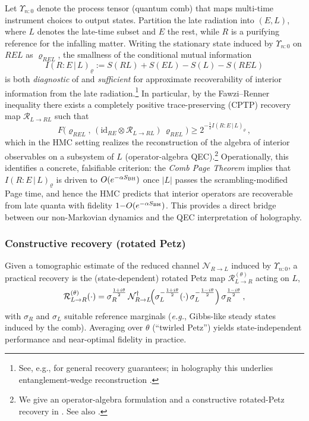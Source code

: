 \documentclass[aps,prd,preprint,onecolumn,superscriptaddress,nofootinbib,longbibliography,floatfix,11pt,showpacs,showkeys]{revtex4-2}
\newcommand{\eg}{\textit{e.g.}\xspace}
\newcommand{\HMC}{\textsc{HMC}\xspace}
\theoremstyle{plain}
\theoremstyle{definition}
\theoremstyle{remark}
\begin{document}
Let $\Upsilon_{n{:}0}$ denote the process tensor (quantum comb) that maps multi-time instrument choices to output states. Partition the late radiation into $(E,L)$, where $L$ denotes the late-time subset and $E$ the rest, while $R$ is a purifying reference for the infalling matter.
Writing the stationary state induced by $\Upsilon_{n{:}0}$ on $REL$ as $\varrho_{REL}$, the smallness of the conditional mutual information
\begin{equation}
I(R{:}E\,|\,L)_{\varrho} := S(RL) + S(EL) - S(L) - S(REL)
\end{equation}
is both \emph{diagnostic} of and \emph{sufficient} for approximate recoverability of interior information from the late radiation.\footnote{See, e.g., \cite{FawziRenner:2015} for general recovery guarantees; in holography this underlies entanglement-wedge reconstruction \cite{ADH:2015}.}
In particular, by the Fawzi--Renner inequality there exists a completely positive trace-preserving (CPTP) recovery map $\mathcal{R}_{L\to RL}$ such that
\begin{equation}
F\bigl(\varrho_{REL},\, (\mathrm{id}_{RE}\otimes \mathcal{R}_{L\to RL})\,\varrho_{REL}\bigr) \geq 2^{-\tfrac12 I(R{:}E\,|\,L)_{\varrho}}\,,
\end{equation}
which in the \HMC{} setting realizes the reconstruction of the algebra of interior observables on a subsystem of $L$ (operator-algebra QEC).\footnote{We give an operator-algebra formulation and a constructive rotated-Petz recovery in . See also \cite{Petz:1986,ADH:2015,Pastawski:2015}.}
Operationally, this identifies a concrete, falsifiable criterion: the \emph{Comb Page Theorem} implies that $I(R{:}E\,|\,L)_{\varrho}$ is driven to $O(e^{-\alpha S_{\rm BH}})$ once $|L|$ passes the scrambling-modified Page time, and hence the \HMC{} predicts that interior operators are recoverable from late quanta with fidelity $1{-}O(e^{-\alpha S_{\rm BH}})$.
This provides a direct bridge between our non-Markovian dynamics and the QEC interpretation of holography.

\subsubsection{Constructive recovery (rotated Petz)}
Given a tomographic estimate of the reduced channel $\mathcal{N}_{R\to L}$ induced by $\Upsilon_{n{:}0}$, a practical recovery is the (state-dependent) rotated Petz map $\mathcal{R}^{(\theta)}_{L\to R}$ acting on $L$,
\begin{equation}
\mathcal{R}^{(\theta)}_{L\to R}(\cdot) = \sigma_R^{\frac{1+i\theta}{2}}\, \mathcal{N}_{R\to L}^{\dagger}\!\Bigl(\sigma_L^{-\frac{1+i\theta}{2}}(\cdot)\,\sigma_L^{-\frac{1-i\theta}{2}}\Bigr)\,\sigma_R^{\frac{1-i\theta}{2}}\,,
\end{equation}
with $\sigma_R$ and $\sigma_L$ suitable reference marginals (\eg, Gibbs-like steady states induced by the comb).
Averaging over $\theta$ (``twirled Petz'') yields state-independent performance and near-optimal fidelity in practice.
\end{document}
